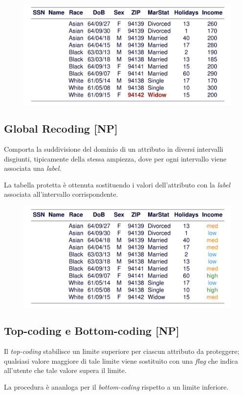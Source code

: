 \documentclass{report}
\begin{document}
\begin{figure}[ht]
    \centering
    \includegraphics[width=0.75\linewidth]{images/local-sup.png}
\end{figure}

\subsection{Global Recoding [NP]}
Comporta la suddivisione del dominio di un attributo in diversi
intervalli disgiunti, tipicamente della stessa ampiezza, dove per 
ogni intervallo viene associata una \textit{label}.

La tabella protetta è ottenuta sostituendo i valori dell'attributo
con la \textit{label} associata all'intervallo corrispondente.

\begin{figure}[ht]
    \centering
    \includegraphics[width=0.75\linewidth]{images/global-recoding.png}
\end{figure}

\subsection{Top-coding e Bottom-coding [NP]}
Il \textit{top-coding} stabilisce un limite superiore per ciascun attributo 
da proteggere; qualsiasi valore maggiore di tale limite viene sostituito con 
una \textit{flag} che indica all'utente che tale valore supera il limite.

La procedura è ananloga per il \textit{bottom-coding} rispetto a un limite inferiore.
\end{document}
